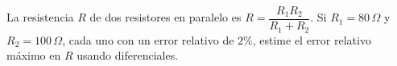 La resistencia $R$ de dos resistores en paralelo es $R = \dfrac{R_1 R_2}{R_1 + R_2}$. Si $R_1 = 80\,\Omega$ y $R_2 = 100\,\Omega$, cada uno con un error relativo de $2\%$, estime el error relativo máximo en $R$ usando diferenciales.
